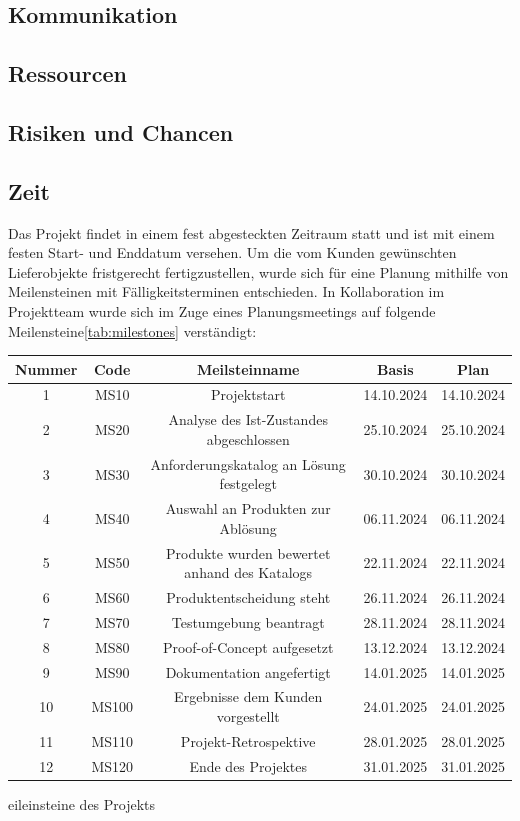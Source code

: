 \documentclass[12pt,oneside]{article}
\begin{document}
\subsection{Kommunikation}

\subsection{Ressourcen}

\subsection{Risiken und Chancen}

\subsection{Zeit}
Das Projekt findet in einem fest abgesteckten Zeitraum statt und ist mit einem festen Start- und Enddatum versehen.
Um die vom Kunden gewünschten Lieferobjekte fristgerecht fertigzustellen, wurde sich für eine Planung mithilfe von Meilensteinen mit
Fälligkeitsterminen entschieden. In Kollaboration im Projektteam wurde sich im Zuge eines Planungsmeetings auf folgende Meilensteine\ref{tab:milestones} verständigt: \\

\begin{centering}
\begin{tabular}{|c|c|c|c|c|}
  \hline
  Nummer & Code & Meilsteinname & Basis & Plan \\
  \hline
  1 & MS10 & Projektstart & 14.10.2024 & 14.10.2024 \\
  \hline
  2 & MS20 & Analyse des Ist-Zustandes abgeschlossen & 25.10.2024 & 25.10.2024 \\
  \hline
  3 & MS30 & Anforderungskatalog an Lösung festgelegt & 30.10.2024 & 30.10.2024 \\
  \hline
  4 & MS40 & Auswahl an Produkten zur Ablösung & 06.11.2024 & 06.11.2024 \\
  \hline
  5 & MS50 & Produkte wurden bewertet anhand des Katalogs & 22.11.2024 & 22.11.2024 \\
  \hline
  6 & MS60 & Produktentscheidung steht & 26.11.2024 & 26.11.2024 \\
  \hline
  7 & MS70 & Testumgebung beantragt & 28.11.2024 & 28.11.2024 \\
  \hline
  8 & MS80 & Proof-of-Concept aufgesetzt & 13.12.2024 & 13.12.2024 \\
  \hline
  9 & MS90 & Dokumentation angefertigt & 14.01.2025 & 14.01.2025 \\
  \hline
  10 & MS100 & Ergebnisse dem Kunden vorgestellt & 24.01.2025 & 24.01.2025 \\
  \hline
  11 & MS110 & Projekt-Retrospektive & 28.01.2025 & 28.01.2025 \\
  \hline
  12 & MS120 & Ende des Projektes & 31.01.2025 & 31.01.2025 \\
  \hline
\end{tabular}
  \caption Meileinsteine des Projekts
  \label{tab:milestones}
\end{centering}
\end{document}
